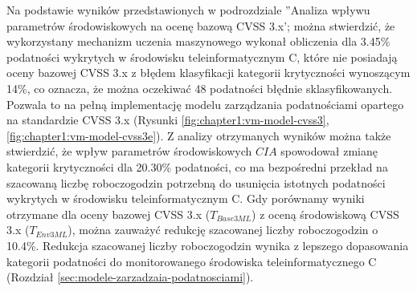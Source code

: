 \bigbreak
Na podstawie wyników przedstawionych w podrozdziale ''Analiza wpływu parametrów środowiskowych na ocenę bazową CVSS 3.x'; można stwierdzić, że wykorzystany mechanizm uczenia maszynowego wykonał obliczenia dla 3.45\% podatności wykrytych w środowisku teleinformatycznym C, które nie posiadają oceny bazowej CVSS 3.x z błędem klasyfikacji kategorii krytyczności wynoszącym 14\%, co oznacza, że można oczekiwać 48 podatności błędnie sklasyfikowanych. Pozwala to na pełną implementację modelu zarządzania podatnościami opartego na standardzie CVSS 3.x (Rysunki \ref{fig:chapter1:vm-model-cvss3}, \ref{fig:chapter1:vm-model-cvss3e}). Z analizy otrzymanych wyników można także stwierdzić, że wpływ parametrów środowiskowych $CIA$ spowodował zmianę kategorii krytyczności dla 20.30\% podatności, co ma bezpośredni przekład na szacowaną liczbę roboczogodzin potrzebną do usunięcia istotnych podatności wykrytych w środowisku teleinformatycznym C. Gdy porównamy wyniki otrzymane dla oceny bazowej CVSS 3.x ($T_{Base3ML}$) z oceną środowiskową CVSS 3.x ($T_{Env3ML}$), można zauważyć redukcję szacowanej liczby roboczogodzin o 10.4\%. Redukcja szacowanej liczby roboczogodzin wynika z lepszego dopasowania kategorii podatności do monitorowanego środowiska teleinformatycznego C (Rozdział \ref{sec:modele-zarzadzaia-podatnosciami}).


